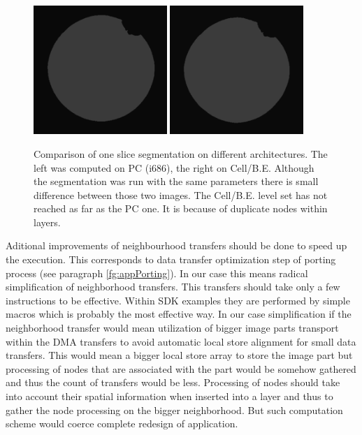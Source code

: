 \begin{figure}
    \centering
    \includegraphics[width=0.45\textwidth]{data/png/pcSlice}
    \includegraphics[width=0.45\textwidth]{data/png/cellSlice}
    \caption[Comparison of one slice segmented on different architectures]{Comparison of one slice segmentation on different architectures.
The left was computed on PC (i686), the right on Cell/B.E.
Although the segmentation was run with the same parameters there is small difference between those two images.
The Cell/B.E. level set has not reached as far as the PC one.
It is because of duplicate nodes within layers.
}
    \label{fg:sliceComparison}
\end{figure}

\par
Aditional improvements of neighbourhood transfers should be done to speed up the execution.
This corresponds to data transfer optimization step of porting process (see paragraph \ref{fg:appPorting}).
In our case this means radical simplification of neighborhood transfers.
This transfers should take only a few instructions to be effective.
Within SDK examples they are performed by simple macros which is probably the most effective way.
In our case simplification if the neighborhood transfer would mean utilization of bigger image parts transport within the DMA transfers to avoid automatic local store alignment for small data transfers.
This would mean a bigger local store array to store the image part but processing of nodes that are associated with the part would be somehow gathered and thus the count of transfers would be less.
Processing of nodes should take into account their spatial information when inserted into a layer and thus to gather the node processing on the bigger neighborhood.
But such computation scheme would coerce complete redesign of application.

